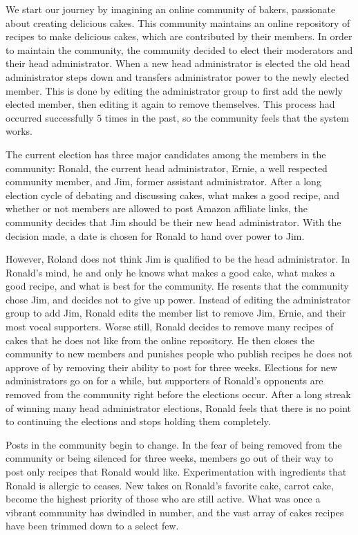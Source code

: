 We start our journey by imagining an online community of bakers, passionate
about creating delicious cakes. This community maintains an online repository of
recipes to make delicious cakes, which are contributed by their members. In
order to maintain the community, the community decided to elect their moderators
and their head administrator. When a new head administrator is elected the old
head administrator steps down and transfers administrator power to the newly
elected member. This is done by editing the administrator group to first add the
newly elected member, then editing it again to remove themselves. This process
had occurred successfully 5 times in the past, so the community feels that the
system works.

The current election has three major candidates among the members in the
community: Ronald, the current head administrator, Ernie, a well respected
community member, and Jim, former assistant administrator. After a long election
cycle of debating and discussing cakes, what makes a good recipe, and whether
or not members are allowed to post Amazon affiliate links, the community decides
that Jim should be their new head administrator. With the decision made, a date
is chosen for Ronald to hand over power to Jim.

However, Roland does not think Jim is qualified to be the head administrator. In
Ronald's mind, he and only he knows what makes a good cake, what makes a good
recipe, and what is best for the community. He resents that the community chose
Jim, and decides not to give up power. Instead of editing the administrator
group to add Jim, Ronald edits the member list to remove Jim, Ernie, and their
most vocal supporters. Worse still, Ronald decides to remove many recipes of
cakes that he does not like from the online repository. He then closes the
community to new members and punishes people who publish recipes he does not
approve of by removing their ability to post for three weeks. Elections for new
administrators go on for a while, but supporters of Ronald's opponents are
removed from the community right before the elections occur. After a long streak
of winning many head administrator elections, Ronald feels that there is no
point to continuing the elections and stops holding them completely.

Posts in the community begin to change. In the fear of being removed from the
community or being silenced for three weeks, members go out of their way to post
only recipes that Ronald would like. Experimentation with ingredients that
Ronald is allergic to ceases. New takes on Ronald's favorite cake, carrot cake,
become the highest priority of those who are still active. What was once a
vibrant community has dwindled in number, and the vast array of cakes recipes
have been trimmed down to a select few.

